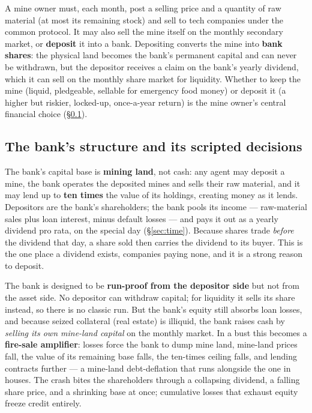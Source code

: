 \documentclass[11pt]{article}
\begin{document}
A mine owner must, each month, post a selling price and a quantity of raw
material (at most its remaining stock) and sell to tech companies under the
common protocol. It may also sell the mine itself on the monthly secondary
market, or \textbf{deposit} it into a bank. Depositing converts the mine into
\textbf{bank shares}: the physical land becomes the bank's permanent capital and
can never be withdrawn, but the depositor receives a claim on the bank's yearly
dividend, which it can sell on the monthly share market for liquidity. Whether
to keep the mine (liquid, pledgeable, sellable for emergency food money) or
deposit it (a higher but riskier, locked-up, once-a-year return) is the mine
owner's central financial choice (\S\ref{sec:bank}).

\subsection{The bank's structure and its scripted decisions}
\label{sec:bank}

The bank's capital base is \textbf{mining land}, not cash: any agent may deposit
a mine, the bank operates the deposited mines and sells their raw material, and
it may lend up to \textbf{ten times} the value of its holdings, creating money
as it lends. Depositors are the bank's shareholders; the bank pools its income
--- raw-material sales plus loan interest, minus default losses --- and pays it
out as a yearly dividend pro rata, on the special day (\S\ref{sec:time}). Because
shares trade \emph{before} the dividend that day, a share sold then carries the
dividend to its buyer. This is the one place a dividend exists, companies paying
none, and it is a strong reason to deposit.

The bank is designed to be \textbf{run-proof from the depositor side} but not
from the asset side. No depositor can withdraw capital; for liquidity it sells
its share instead, so there is no classic run. But the bank's equity still
absorbs loan losses, and because seized collateral (real estate) is illiquid,
the bank raises cash by \emph{selling its own mine-land capital} on the monthly
market. In a bust this becomes a \textbf{fire-sale amplifier}: losses force the
bank to dump mine land, mine-land prices fall, the value of its remaining base
falls, the ten-times ceiling falls, and lending contracts further --- a
mine-land debt-deflation that runs alongside the one in houses. The crash bites
the shareholders through a collapsing dividend, a falling share price, and a
shrinking base at once; cumulative losses that exhaust equity freeze credit
entirely.
\end{document}
